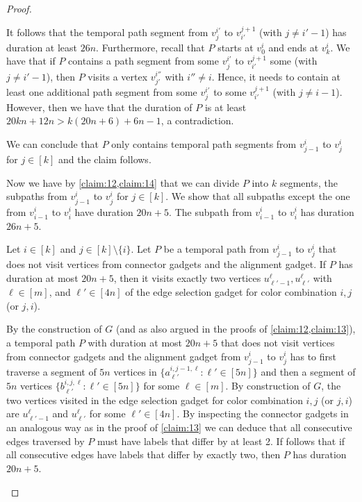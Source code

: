 \documentclass[a4paper,UKenglish,cleveref, autoref, thm-restate, anonymous]{lipics-v2021}
\begin{document}
\begin{proof}
\begin{claimproof}
It follows that the temporal path segment from $v^{i'}_j$ to $v^{j+1}_{i'}$ (with $j\neq i'-1$) has duration at least $26n$.
Furthermore, recall that $P$ starts at $v^i_0$ and ends at $v^i_k$. We have that if $P$ contains a path segment from some $v^{i'}_j$ to $v^{j+1}_{i'}$ some (with $j\neq i'-1$), then $P$ visits a vertex $v^{i''}_{j'}$ with $i''\neq i$. Hence, it needs to contain at least one additional path segment from some $v^{i'}_j$ to some $v^{j+1}_{i'}$ (with $j\neq i-1$). However, then we have that the duration of $P$ is at least $20kn+12n>k(20n+6)+6n-1$, a contradiction.

We can conclude that $P$ only contains temporal path segments from $v^{i}_{j-1}$ to $v^i_{j}$ for $j\in[k]$ and the claim follows.
%
    \end{claimproof}

Now we have by \cref{claim:12,claim:14} that we can divide $P$ into $k$ segments, the subpaths from $v^i_{j-1}$ to $v^i_j$ for $j\in [k]$. We show that all subpaths except the one from $v_{i-1}^i$ to $v_i^i$ have duration $20n+5$. The subpath from $v_{i-1}^i$ to $v_i^i$ has duration $26n+5$.

\begin{claim}\label{claim:15}
    Let $i\in[k]$ and $j\in[k]\setminus\{i\}$. Let $P$ be a temporal path from $v_{j-1}^i$ to $v_j^i$ that does not visit vertices from connector gadgets and the alignment gadget. If $P$ has duration at most $20n+5$, then it visits exactly two vertices $u^\ell_{\ell'-1},u^\ell_{\ell'}$ with $\ell\in[m]$, and $\ell'\in[4n]$ of the edge selection gadget for color combination $i,j$ (or $j,i$).
\end{claim}
\begin{claimproof}
    By the construction of $G$ (and as also argued in the proofs of \cref{claim:12,claim:13}), a temporal path $P$ with duration at most $20n+5$ that does not visit vertices from connector gadgets and the alignment gadget from $v_{j-1}^i$ to $v_j^i$ has to first traverse a segment of $5n$ vertices in $\{a^{i,j-1,\ell}_{\ell'} :  \ell'\in[5n]\}$ and then a segment of $5n$ vertices $\{b^{i,j,\ell}_{\ell'} :  \ell'\in[5n]\}$ for some $\ell\in[m]$. By construction of $G$, the two vertices visited in the edge selection gadget for color combination $i,j$ (or $j,i$) are $u^\ell_{\ell'-1}$ and $u^\ell_{\ell'}$ for some $\ell'\in[4n]$. By inspecting the connector gadgets in an analogous way as in the proof of \cref{claim:13} we can deduce that all consecutive edges traversed by $P$ must have labels that differ by at least 2. If follows that if all consecutive edges have labels that differ by exactly two, then $P$ has duration $20n+5$.
\end{claimproof}


\end{proof}
\end{document}
